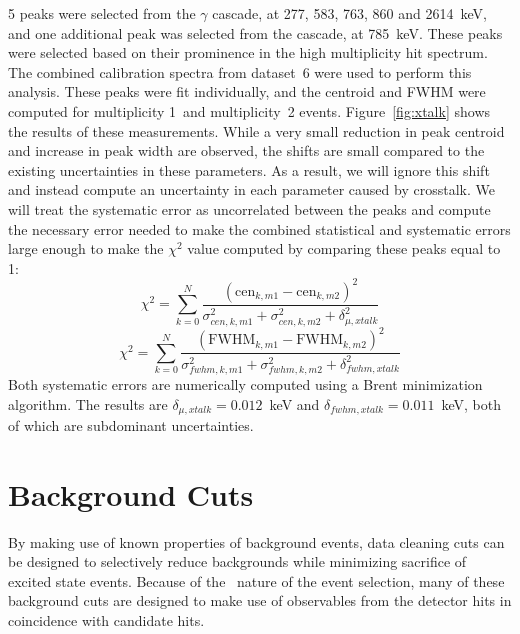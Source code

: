 \documentclass[/main.tex]{subfiles}
\begin{document}
5 peaks were selected from the  $\gamma$ cascade, at 277, 583, 763, 860 and 2614~keV, and one additional peak was selected from the  cascade, at 785~keV.
These peaks were selected based on their prominence in the high multiplicity hit spectrum.
The combined calibration spectra from dataset~6 were used to perform this analysis.
These peaks were fit individually, and the centroid and FWHM were computed for multiplicity 1~and multiplicity~2 events.
Figure~\ref{fig:xtalk} shows the results of these measurements.
While a very small reduction in peak centroid and increase in peak width are observed, the shifts are small compared to the existing uncertainties in these parameters.
As a result, we will ignore this shift and instead compute an uncertainty in each parameter caused by crosstalk.
We will treat the systematic error as uncorrelated between the peaks and compute the necessary error needed to make the combined statistical and systematic errors large enough to make the $\chi^2$ value computed by comparing these peaks equal to 1:
\begin{equation}
  \chi^2 = \displaystyle\sum_{k=0}^N \frac{(\mathrm{cen}_{k,m1} - \mathrm{cen}_{k,m2})^2}{\sigma_{cen,k,m1}^2+\sigma_{cen,k,m2}^2+\delta_{\mu,xtalk}^2}
\end{equation}
\begin{equation}
  \chi^2 = \displaystyle\sum_{k=0}^N \frac{(\mathrm{FWHM}_{k,m1} - \mathrm{FWHM}_{k,m2})^2}{\sigma_{fwhm,k,m1}^2+\sigma_{fwhm,k,m2}^2+\delta_{fwhm,xtalk}^2}
\end{equation}
Both systematic errors are numerically computed using a Brent minimization algorithm.
The results are $\delta_{\mu,xtalk}=0.012$~keV and $\delta_{fwhm,xtalk}=0.011$~keV, both of which are subdominant uncertainties.


\section{Background Cuts}
By making use of known properties of background events, data cleaning cuts can be designed to selectively reduce backgrounds while minimizing sacrifice of excited state events.
Because of the \md\ nature of the event selection, many of these background cuts are designed to make use of observables from the detector hits in coincidence with candidate hits.
\end{document}
